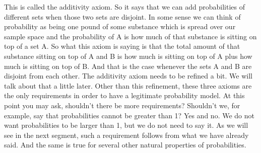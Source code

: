 \documentclass[pdftex, brazil, 12pt, twoside]{article}
\begin{document}
This is called the additivity axiom.
So it says that we can add probabilities of different
sets when those two sets are disjoint.
In some sense we can think of probability as being one pound
of some substance which is spread over our sample space
and the probability of A is how much of that substance is
sitting on top of a set A. So what this axiom is saying is
that the total amount of that substance sitting on top of A
and B is how much is sitting on top of A plus how much is
sitting on top of B. And that is the case whenever the sets
A and B are disjoint from each other.
The additivity axiom needs to be refined a bit.
We will talk about that a little later.
Other than this refinement, these three axioms are the
only requirements in order to have a
legitimate probability model.
At this point you may ask, shouldn't there be more
requirements?
Shouldn't we, for example, say that probabilities cannot be
greater than 1?
Yes and no.
We do not want probabilities to be larger than 1, but we do
not need to say it.
As we will see in the next segment, such a requirement
follows from what we have already said.
And the same is true for several other natural
properties of probabilities.




\end{document}
